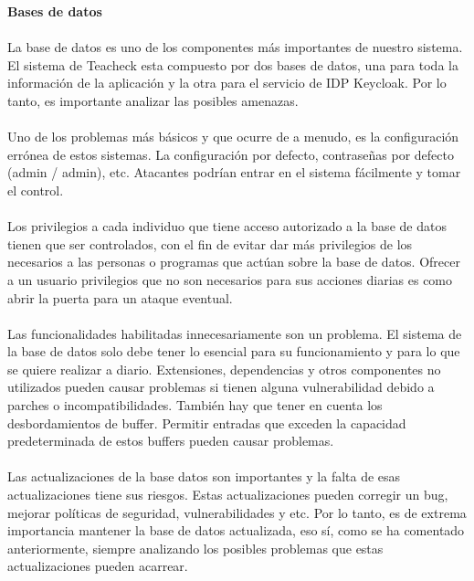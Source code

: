 \textbf{Bases de datos}
\paragraph{}
La base de datos es uno de los componentes más importantes de nuestro
sistema. El sistema de Teacheck esta compuesto por dos bases de datos,
una para toda la información de la aplicación y la otra para el
servicio de IDP Keycloak. Por lo tanto, es importante analizar las
posibles amenazas.
\paragraph{}
Uno de los problemas más básicos y que ocurre de a menudo, es la
configuración errónea de estos sistemas. La configuración por defecto,
contraseñas por defecto (admin / admin), etc.  Atacantes podrían
entrar en el sistema fácilmente y tomar el control.
\paragraph{}
Los privilegios a cada individuo que tiene acceso autorizado a la base
de datos tienen que ser controlados, con el fin de evitar dar más
privilegios de los necesarios a las personas o programas que actúan
sobre la base de datos. Ofrecer a un usuario privilegios que no son
necesarios para sus acciones diarias es como abrir la puerta para un
ataque eventual.
\paragraph{}
Las funcionalidades habilitadas innecesariamente son un problema. El
sistema de la base de datos solo debe tener lo esencial para su
funcionamiento y para lo que se quiere realizar a diario. Extensiones,
dependencias y otros componentes no utilizados pueden causar problemas
si tienen alguna vulnerabilidad debido a parches o incompatibilidades.
También hay que tener en cuenta los desbordamientos de
buffer. Permitir entradas que exceden la capacidad predeterminada de
estos buffers pueden causar problemas.
\paragraph{}
Las actualizaciones de la base datos son importantes y la falta de
esas actualizaciones tiene sus riesgos. Estas actualizaciones pueden
corregir un bug, mejorar políticas de seguridad, vulnerabilidades y
etc. Por lo tanto, es de extrema importancia mantener la base de datos
actualizada, eso sí, como se ha comentado anteriormente, siempre
analizando los posibles problemas que estas actualizaciones pueden
acarrear.

